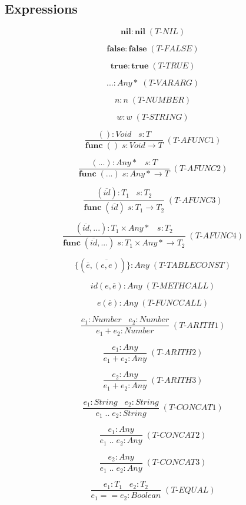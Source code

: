 \documentclass[12pt]{article}
\begin{document}
\subsection{Expressions}

\[
\textbf{nil} : \textbf{nil} \; (\textit{T-NIL})
\]

\[
\textbf{false} : \textbf{false} \; (\textit{T-FALSE})
\]

\[
\textbf{true} : \textbf{true} \; (\textit{T-TRUE})
\]

\[
{...} : {Any*} \; (\textit{T-VARARG})
\]

\[
n : n \; (\textit{T-NUMBER})
\]

\[
w : w \; (\textit{T-STRING})
\]

\[
\frac{():Void \;\;\; s:T}
     {\textbf{func} \; () \; s : Void \rightarrow T} \;
     (\textit{T-AFUNC1})
\]

\[
\frac{(...):{Any*} \;\;\; s:T}
     {\textbf{func} \; (...) \; s : {Any*} \rightarrow T} \;
     (\textit{T-AFUNC2})
\]

\[
\frac{(\overline{id}):T_{1} \;\;\; s:T_{2}}
     {\textbf{func} \; (\overline{id}) \; s : T_{1} \rightarrow T_{2}} \;
     (\textit{T-AFUNC3})
\]

\[
\frac{(\overline{id},...):T_{1} \times {Any*} \;\;\; s:T_{2}}
     {\textbf{func} \; (\overline{id},...) \; s :
       T_{1} \times {Any*} \rightarrow T_{2}} \;
     (\textit{T-AFUNC4})
\]

\[
\{(\overline{e},\overline{(e,e)})\} : Any \; (\textit{T-TABLECONST})
\]

\[
id(e,\overline{e}) : Any \; (\textit{T-METHCALL})
\]

\[
e(\overline{e}) : Any \; (\textit{T-FUNCCALL})
\]

\[
\frac{e_{1}:Number \;\;\; e_{2}:Number}
     {e_{1} + e_{2} : Number} \; (\textit{T-ARITH1})
\]

\[
\frac{e_{1}:Any}
     {e_{1} + e_{2} : Any} \; (\textit{T-ARITH2})
\]

\[
\frac{e_{2}:Any}
     {e_{1} + e_{2} : Any} \; (\textit{T-ARITH3})
\]

\[
\frac{e_{1}:String \;\;\; e_{2}:String}
     {e_{1} \; {..} \; e_{2} : String} \; (\textit{T-CONCAT1})
\]

\[
\frac{e_{1}:Any}
     {e_{1} \; {..} \; e_{2} : Any} \; (\textit{T-CONCAT2})
\]

\[
\frac{e_{2}:Any}
     {e_{1} \; {..} \; e_{2} : Any} \; (\textit{T-CONCAT3})
\]

\[
\frac{e_{1}:T_{1} \;\;\; e_{2}:T_{2}}
     {e_{1} == e_{2} : Boolean} \; (\textit{T-EQUAL})
\]
\end{document}
